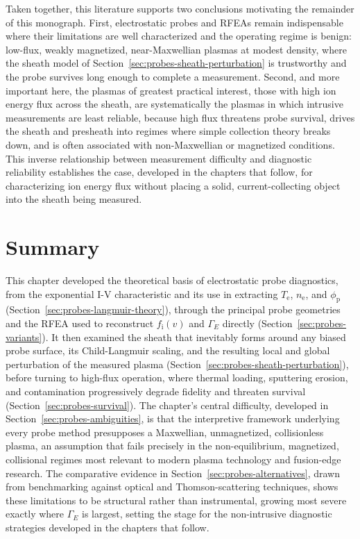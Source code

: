 Taken together, this literature supports two conclusions motivating the remainder of this monograph. First, electrostatic probes and RFEAs remain indispensable where their limitations are well characterized and the operating regime is benign: low-flux, weakly magnetized, near-Maxwellian plasmas at modest density, where the sheath model of Section~\ref{sec:probes-sheath-perturbation} is trustworthy and the probe survives long enough to complete a measurement. Second, and more important here, the plasmas of greatest practical interest, those with high ion energy flux across the sheath, are systematically the plasmas in which intrusive measurements are least reliable, because high flux threatens probe survival, drives the sheath and presheath into regimes where simple collection theory breaks down, and is often associated with non-Maxwellian or magnetized conditions. This inverse relationship between measurement difficulty and diagnostic reliability establishes the case, developed in the chapters that follow, for characterizing ion energy flux without placing a solid, current-collecting object into the sheath being measured.

\section{Summary}
\label{sec:probes-summary}

This chapter developed the theoretical basis of electrostatic probe diagnostics, from the exponential I-V characteristic and its use in extracting $T_{\mathrm{e}}$, $n_{\mathrm{e}}$, and $\phi_{\mathrm{p}}$ (Section~\ref{sec:probes-langmuir-theory}), through the principal probe geometries and the RFEA used to reconstruct $f_{\mathrm{i}}(v)$ and $\Gamma_{E}$ directly (Section~\ref{sec:probes-variants}). It then examined the sheath that inevitably forms around any biased probe surface, its Child-Langmuir scaling, and the resulting local and global perturbation of the measured plasma (Section~\ref{sec:probes-sheath-perturbation}), before turning to high-flux operation, where thermal loading, sputtering erosion, and contamination progressively degrade fidelity and threaten survival (Section~\ref{sec:probes-survival}). The chapter's central difficulty, developed in Section~\ref{sec:probes-ambiguities}, is that the interpretive framework underlying every probe method presupposes a Maxwellian, unmagnetized, collisionless plasma, an assumption that fails precisely in the non-equilibrium, magnetized, collisional regimes most relevant to modern plasma technology and fusion-edge research. The comparative evidence in Section~\ref{sec:probes-alternatives}, drawn from benchmarking against optical and Thomson-scattering techniques, shows these limitations to be structural rather than instrumental, growing most severe exactly where $\Gamma_E$ is largest, setting the stage for the non-intrusive diagnostic strategies developed in the chapters that follow.
